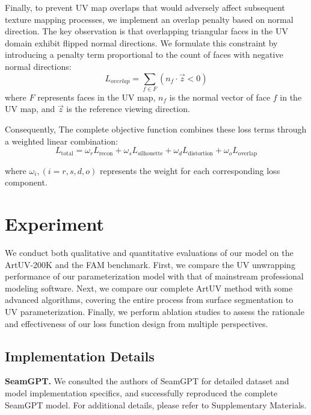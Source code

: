 \documentclass{article}
\begin{document}
Finally, to prevent UV map overlaps that would adversely affect subsequent texture mapping processes, we implement an overlap penalty based on normal direction. The key observation is that overlapping triangular faces in the UV domain exhibit flipped normal directions. We formulate this constraint by introducing a penalty term proportional to the count of faces with negative normal directions:
\begin{equation}
L_{overlap} = \sum_{f\in F} (n_{f} \cdot \vec{z} < 0)  
\end{equation}
where $F$ represents faces in the UV map, $n_f$ is the normal vector of face $f$ in the UV map, and $\vec{z}$ is the reference viewing direction.

Consequently, The complete objective function combines these loss terms through a weighted linear combination:
\begin{equation}
L_{\text{total}} = \omega_{r} L_{\text{recon}} + \omega_{s} L_{\text{silhouette}} + \omega_{d} L_{\text{distortion}} + \omega_{o} L_{\text{overlap}} 
\end{equation}

where $\omega_{i}, (i=r,s,d,o)$ represents the weight for each corresponding loss component.

\section{Experiment}
We conduct both qualitative and quantitative evaluations of our model on the ArtUV-200K and the FAM benchmark. First, we compare the UV unwrapping performance of our parameterization model with that of mainstream professional modeling software. Next, we compare our complete ArtUV method with some advanced algorithms, covering the entire process from surface segmentation to UV parameterization. Finally, we perform ablation studies to assess the rationale and effectiveness of our loss function design from multiple perspectives.

\subsection{Implementation Details}
\textbf{SeamGPT.}
We consulted the authors of SeamGPT for detailed dataset and model implementation specifics, and successfully reproduced the complete SeamGPT model. For additional details, please refer to Supplementary Materials.
\end{document}
